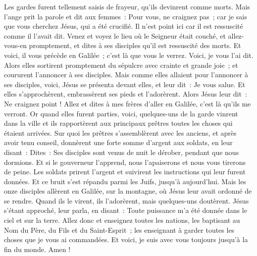 \begin{multicols}{2}
Les gardes furent tellement saisis de frayeur, qu'ils devinrent comme morts.
Mais l'ange prit la parole et dit aux femmes~: Pour vous, ne craignez pas~; car je sais que vous cherchez Jésus, qui a été crucifié.
Il n'est point ici car il est ressuscité comme il l'avait dit. Venez et voyez le lieu où le Seigneur était couché,
et allez-vous-en promptement, et dites à ses disciples qu'il est ressuscité des morts. Et voici, il vous précède en Galilée~; c'est là que vous le verrez. Voici, je vous l'ai dit.
Alors elles sortirent promptement du sépulcre avec crainte et grande joie~; et coururent l'annoncer à ses disciples.
Mais comme elles allaient pour l'annoncer à ses disciples, voici, Jésus se présenta devant elles, et leur dit~: Je vous salue. Et elles s'approchèrent, embrassèrent ses pieds et l'adorèrent.
Alors Jésus leur dit~: Ne craignez point ! Allez et dites à mes frères d'aller en Galilée, c'est là qu'ils me verront.
 Or quand elles furent parties, voici, quelques-uns de la garde vinrent dans la ville et ils rapportèrent aux principaux prêtres toutes les choses qui étaient arrivées.
Sur quoi les prêtres s'assemblèrent avec les anciens, et après avoir tenu conseil, donnèrent une forte somme d'argent aux soldats,
en leur disant~: Dites~: Ses disciples sont venus de nuit le dérober, pendant que nous dormions.
Et si le gouverneur l'apprend, nous l'apaiserons et nous vous tirerons de peine.
Les soldats prirent l'argent et suivirent les instructions qui leur furent données. Et ce bruit s'est répandu parmi les Juifs, jusqu'à aujourd'hui.
Mais les onze disciples allèrent en Galilée, sur la montagne, où Jésus leur avait ordonné de se rendre.
Quand ils le virent, ils l'adorèrent, mais quelques-uns doutèrent.
Jésus s'étant approché, leur parla, en disant~: Toute puissance m'a été donnée dans le ciel et sur la terre.
Allez donc et enseignez toutes les nations, les baptisant au Nom du Père, du Fils et du Saint-Esprit~;
les enseignant à garder toutes les choses que je vous ai commandées. Et voici, je suis avec vous toujours jusqu'à la fin du monde. Amen !
\PPE{}
\end{multicols}
